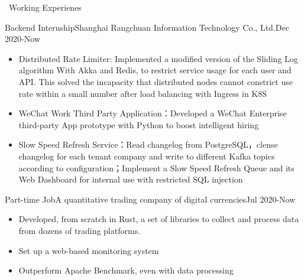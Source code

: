 \documentclass{resume}
\begin{document}
\begin{rSection}{\faUsers~Working Experienes}
    \begin{rExperience}{Backend Internship}{Shanghai Rangchuan Information Technology Co., Ltd.}{Dec 2020-Now}
        \begin{itemize}
            \itemsep -0.5em \vspace{-0.5em}
            \item Distributed Rate Limiter: Implemented  a modified version of the Sliding Log algorithm With Akka and Redis, to restrict service usage for each user and API. This solved the incapacity that distributed nodes cannot constrict use rate within a small number after load balancing with Ingress in K8S
            \item WeChat Work Third Party Application：Developed a WeChat Enterprise third-party App prototype with Python to boost intelligent hiring
            \item Slow Speed Refresh Service：Read changelog from PostgreSQL，clense changelog for each tenant company and write to different Kafka topics according to configuration；Implement a Slow Speed Refresh Queue and its Web Dashboard for internal use with restricted SQL injection
        \end{itemize}
    \end{rExperience}
    \begin{rExperience}{Part-time Job}{A quantitative trading company of digital currencies}{Jul 2020-Now}
        \begin{itemize}
            \itemsep -0.5em \vspace{-0.5em}
            \item Developed, from scratch in Rust, a set of libraries to collect and process data from dozens of trading platforms.
            \item Set up a web-based monitoring system
            \item Outperform Apache Benchmark, even with data processing
        \end{itemize}
    \end{rExperience}

\end{rSection}
\end{document}
